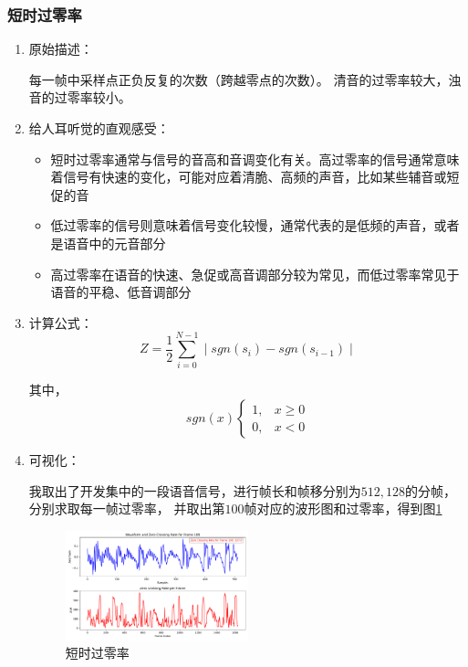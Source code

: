 \documentclass[a4paper]{article}
\begin{document}
\subsubsection{短时过零率}
\begin{enumerate}
  \item 
  {
    原始描述：

    每一帧中采样点正负反复的次数（跨越零点的次数）。
    清音的过零率较大，浊音的过零率较小。
  }
  \item 
  {
    给人耳听觉的直观感受：
    \begin{itemize}
      \item 短时过零率通常与信号的音高和音调变化有关。高过零率的信号通常意味着信号有快速的变化，可能对应着清脆、高频的声音，比如某些辅音或短促的音

      \item 低过零率的信号则意味着信号变化较慢，通常代表的是低频的声音，或者是语音中的元音部分
      
      \item 高过零率在语音的快速、急促或高音调部分较为常见，而低过零率常见于语音的平稳、低音调部分
    \end{itemize}
  }
  \item 
  {
    计算公式：
    \begin{equation}
      Z = \frac{1}{2}\sum_{i=0}^{N-1}\mid sgn(s_i) - sgn(s_{i-1})\mid
      \label{eq:ZRC}
    \end{equation}

    其中，
    \begin{equation}
      sgn(x) 
      \begin{cases} 
      1, &x \geqslant 0 \\
      0, &x < 0  
      \end{cases}
      \label{eq:Sign}
    \end{equation}
  }
  \item 
  {
    可视化：

    我取出了开发集中的一段语音信号，进行帧长和帧移分别为$512, 128$的分帧，分别求取每一帧过零率，
    并取出第$100$帧对应的波形图和过零率，得到图\ref{fig:ZCR}
    \begin{figure}
      \centering
      \includegraphics[width=0.5\textwidth]{figs/ZCR.pdf}
      \caption{短时过零率}
      \label{fig:ZCR}
    \end{figure}
  }
\end{enumerate}
\end{document}
